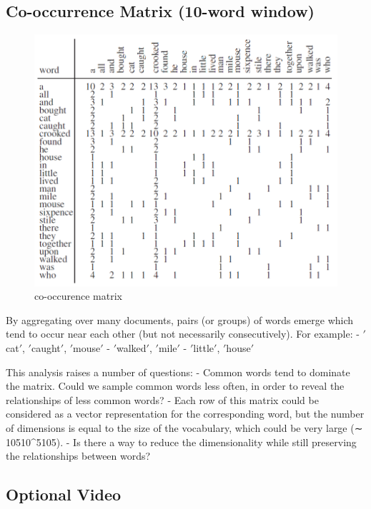 \documentclass[11pt]{article}
\begin{document}
\subsection{Co-occurrence Matrix (10-word window)}\label{subsec:co-occurrence-matrix-(10-word-window)}
\begin{figure}[H]
    \centering
    \includegraphics{../out/images/co-occurence-matrix}
    \caption[co-occurence matrix]{co-occurence matrix}
    \label{fig:co-occurence matrix}
\end{figure}
By aggregating over many documents, pairs (or groups) of words emerge which
tend to occur near each other (but not necessarily consecutively).
For example:
- \('\)cat\('\), \('\)caught\('\), \('\)mouse\('\)
- \('\)walked\('\), \('\)mile\('\)
- \('\)little\('\), \('\)house\('\)

This analysis raises a number of questions:
- Common words tend to dominate the matrix.
Could we sample common words less often, in order to reveal the relationships
of less common words?
- Each row of this matrix could be considered as a vector representation for
the corresponding word, but the number of dimensions is equal to the size of
the vocabulary, which could be very large (∼ 10510^5105).
- Is there a way to reduce the dimensionality while still preserving the
relationships between words?

\subsection{Optional Video}\label{subsec:optional-video}
\end{document}
